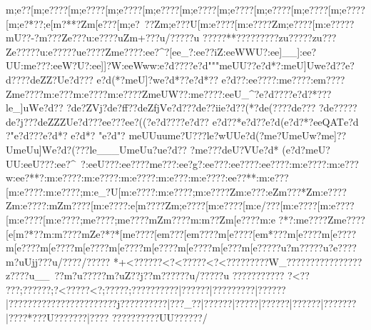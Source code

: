 {{{{{{{{{{{{{{{{{{{{{{{{{{{{{{{{{{{{{{{{{{{{{{{{{{{{{{{{{{{{{{{{{{{{{{{{{{{{{{{{{{{{{{{{{{{{{{{{{{{{{{{{{{{{{{{{{{{{{{{{{{{{{{{{{{{{{{{{{{{{{{{{{{{{{{{{{{{{{{{{{{{{{{{{{{{{{{{{{{{{{{{{{{{{{{{{{{{{{{{{{{{{{{{{{{{{{{{{{{{{{{{{{{{{{{{{{{{{{{{{{{{{{{{{{{{{{{{{{{{{{{{{{{{{{{{{{{{{{{{{{{{{{{{{{{{{{{{{{{{{{{{{{{{{{{{{{{{{{{{{{{{{{{{{{{{{{{{{{{{{{{{{{{{{{{{{{{{{{{{{{{{{{{{{{{{{{{{{{{{{{{{{{{{{{{{{{{{{{{{{{{{{{{{{{{{{{{{{{{{{{{{{{{{{{{{{{{{{{{{{{{{{{{{{{{{{{{{{{{{{{{{{{{{{{{{{{{{{{{{{{{{{{{{{{{{{{{{{{{{{{{{{{{{{{{{{{{{{{{{{{{{{{{{{{{{{{{{{{{{{{{{{{{{{{{{{{{{{{{{{{{{{{{{{{{{{{{{{{{{{{{{{{{{{{{{{{{{{{{{{{{{{{{{{{{{{{{{{{{{{{{{{{{{{{{{{{{{{{{{{{{{{{{{{{{{{{{{{{{{{{{{{{{{{{{{{{{{{{{{{{{{{{{{{{{{{{{{{{{{{{{{{{{{{{{{{{{{{ {m;e??[m;e????[m;e????[m;e????[m;e????[m;e????[m;e????[m;e????[m;e????[m;e????[m;e?*??;e[m?**?Zm[e???[m;e?~??Zm;e???U[m:e????[m:e????Zm;e????[m:e?????}{mU??-?}{m???}Ze???u:e????uZm+?? ?}{u/?????u
?????}**????}?????}zu?????}zu???}Ze?????u:e?????ue????Zme????:ee?^?[ee_?:ee??iZ:eeWWU?:ee]__]:ee?UU:me???:eeW?U?:ee]]?W:eeWww}:e?d????e?d"""meUU??e?d *?:meU]Uwe?d? ?e?d??? ?deZZ?Ue?d??? e?d(*?meU]?we?d*? ?e?d*?? e?d??  :ee????:me????:em????Zme????m:e???m:e????m:e????ZmeUW??:me????:eeU_^?e?d????e?d?*???le_]uWe?d??  ?de?ZVj?de?ff??deZfjVe?d???de??iie?d??(*?de(????de???
?de?????de?j???deZZZUe?d???ee??? ee?((?e?d????e?d?? e?d??*e?d??e?d(   e?d?*?eeQATe?d ?"e?d??? e?d*?
 e?d*? "e?d"?
 meUUuume?U???le?wUUe?d ( ?me?}UmeUw?me]??UmeUu]We?d?(???le___UmeUu?ue?d??
?me?}}??deU?VUe?d* (e?d   ?meU?UU:eeU???:ee?^~?:eeU???:ee????me??}?:ee?g?:ee???:ee????:ee????:m:e????:m:e???w:ee?**?:m:e????:m:e????:m:e????:m:e???:m:e????:ee??**:m:e???[m:e????:m:e????;m:e_?U[m:e????:m:e????;m:e????Zm:e???:eZm???*Zm:e????Zm:e????:mZm????[m:e????:e[m????Zm;e????[m:e????[m:e/???[m:e????[m:e????[m:e????[m:e????;m{e????;m{e????{mZm????{m:m??Zm[e????{m:e
?*?:m{e????Zm{e????[e[m?*??{m:m????{mZe?*?*[m{e????[e{m???[e{m????{m[e????[e{m*???{m[e????{m[e????{m[e????{m[e????{m[e????{m[e????{m[e????{m[e????{m[e???{m[e?????u?m?????u?e????m?uUjj??}?u/????}/?????} 
*+<??????<?<?????<?<???\??????\??W_????}??????}??????}z????u__~??m?u?????m?uZ??j?}?m?????}?u/?????u
?????}??????} 
?<??
???;??????;?<?????<?;?????\?;?????{?\?????|?{?????|?{?????{?\???|?{?????|?{???????{?????{?????????{?j???{???????|?{??_??|?{?????|?{????|?{?????|?{?????|?{?????{?|????*??{?U???{???  {?|???? ??{???????{?UU????{??/
}}}}}}}}}}}}}}}}}}}}}}}}}}}}}}}}}}}}}}}}}}}}}}}}}}}}}}}}}}}}}}}}}}}}}}}}}}}}}}}}}}}}}}}}}}}}}}}}}}}}}}}}}}}}}}}}}}}}}}}}}}}}}}}}}}}}}}}}}}}}}}}}}}}}}}}}}}}}}}}}}}}}}}}}}}}}}}}}}}}}}}}}}}}}}}}}}}}}}}}}}}}}}}}}}}}}}}}}}}}}}}}}}}}}}}}}}}}}}}}}}}}}}}}}}}}}}}}}}}}}}}}}}}}}}}}}}}}}}}}}}}}}}}}}}}}}}}}}}}}}}}}}}}}}}}}}}}}}}}}}}}}}}}}}}}}}}}}}}}}}}}}}}}}}}}}}}}}}}}}}}}}}}}}}}}}}}}}}}}}}}}}}}}}}}}}}}}}}}}}}}}}}}}}}}}}}}}}}}}}}}}}}}}}}}}}}}}}}}}}}}}}}}}}}}}}}}}}}}}}}}}}}}}}}}}}}}}}}}}}}}}}}}}}}}}}}}}}}}}}}}}}}}}}}}}}}}}}}}}}}}}}}}}}}}}}}}}}}}}}}}}}}}}}}}}}}}}}}}}}}}}}}}}}}}}}}}}}}}}}}}}}}}}}}}}}}}}}}}}}}}}}}}}}}}}}}}}}}}}}}}}}}}}}}}}}}}}}}}}}}}}}}}}}}}}}}}}}}}}}}}}}}}}}}}}}}}}}}}}}}}}}}}}}}}}}}}}}}}}}}}}}}}}}}}}}}}}}}}}}}}}}}}}}}}}}}}}}}}}}}}}}
